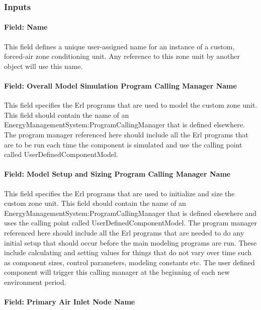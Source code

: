 \subsubsection{Inputs}\label{inputs-050}

\paragraph{Field: Name}\label{field-name-049}

This field defines a unique user-assigned name for an instance of a custom, forced-air zone conditioning unit. Any reference to this zone unit by another object will use this name.

\paragraph{Field: Overall Model Simulation Program Calling Manager Name}\label{field-overall-model-simulation-program-calling-manager-name}

This field specifies the Erl programs that are used to model the custom zone unit. This field should contain the name of an EnergyManagementSystem:ProgramCallingManager that is defined elsewhere. The program manager referenced here should include all the Erl programs that are to be run each time the component is simulated and use the calling point called UserDefinedComponentModel.

\paragraph{Field: Model Setup and Sizing Program Calling Manager Name}\label{field-model-setup-and-sizing-program-calling-manager-name}

This field specifies the Erl programs that are used to initialize and size the custom zone unit. This field should contain the name of an EnergyManagementSystem:ProgramCallingManager that is defined elsewhere and uses the calling point called UserDefinedComponentModel. The program manager referenced here should include all the Erl programs that are needed to do any initial setup that should occur before the main modeling programs are run. These include calculating and setting values for things that do not vary over time such as component sizes, control parameters, modeling constants etc. The user defined component will trigger this calling manager at the beginning of each new environment period.

\paragraph{Field: Primary Air Inlet Node Name}\label{field-primary-air-inlet-node-name-001}

